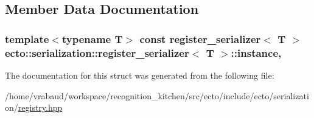 \subsection{Member Data Documentation}
\subsubsection[{\texorpdfstring{instance}{instance}}]{\setlength{\rightskip}{0pt plus 5cm}template$<$typename T$>$ const {\bf register\+\_\+serializer}$<$ T $>$ {\bf ecto\+::serialization\+::register\+\_\+serializer}$<$ T $>$\+::instance\hspace{0.3cm}{\ttfamily [static]}, {\ttfamily [private]}}\hypertarget{structecto_1_1serialization_1_1register__serializer_a742ed82697621237f599631009e47e05}{}\label{structecto_1_1serialization_1_1register__serializer_a742ed82697621237f599631009e47e05}


The documentation for this struct was generated from the following file\+:\begin{DoxyCompactItemize}
\item 
/home/vrabaud/workspace/recognition\+\_\+kitchen/src/ecto/include/ecto/serialization/\hyperlink{serialization_2registry_8hpp}{registry.\+hpp}\end{DoxyCompactItemize}
